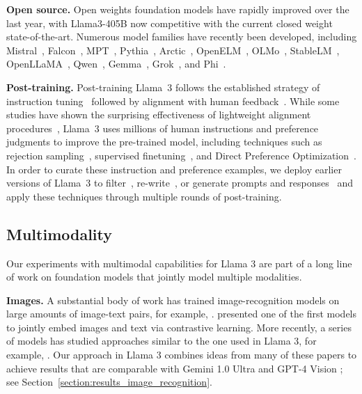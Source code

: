 \textbf{Open source.} Open weights foundation models have rapidly improved over the last year, with Llama3-405B now competitive with the current closed weight state-of-the-art. Numerous model families have recently been developed, including Mistral~\citep{jiang2023mistral}, Falcon~\citep{almazrouei2023falcon}, MPT~\citep{databricksmpt}, Pythia~\citep{biderman2023pythia}, Arctic~\citep{snowflakearctic}, OpenELM~\citep{mehta2024openelm}, OLMo~\citep{groeneveld2024olmoacceleratingsciencelanguage}, StableLM~\citep{bellagente2024stable}, OpenLLaMA~\citep{openlm2023openllama}, Qwen~\citep{bai2023qwen}, Gemma~\citep{team2024gemma}, Grok~\citep{xaigrok}, and Phi~\citep{abdin2024phi}.

\textbf{Post-training.}
Post-training Llama~3 follows the established strategy of instruction tuning~\citep{chung2022scalinginstruction,ouyang2022instructgpt} followed by alignment with human feedback~\citep{kaufmann2023survey}. While some studies have shown the surprising effectiveness of lightweight alignment procedures~\citep{zhou2024lima}, Llama~3 uses millions of human instructions and preference judgments to improve the pre-trained model, including techniques such as rejection sampling~\citep{constitutional-ai-bai}, supervised finetuning~\citep{sanh2022multitask}, and Direct Preference Optimization~\citep{rafailov2023dpo}. In order to curate these instruction and preference examples, we deploy earlier versions of Llama~3 to filter~\citep{liu2024makesgooddataalignment}, re-write~\citep{pan2024selfcorrection}, or generate prompts and responses~\citep{liu2024bestpractices} and apply these techniques through multiple rounds of post-training.

\subsection{Multimodality}
\label{section:related_work_multimodality}
Our experiments with multimodal capabilities for Llama 3 are part of a long line of work on foundation models that jointly model multiple modalities.

\textbf{Images.} 
A substantial body of work has trained image-recognition models on large amounts of image-text pairs, for example, \citet{Mahajan_2018_ECCV,xiao2024florence,chameleon2024,openai2023gpt4blog}.
\citet{radford2021learning} presented one of the first models to jointly embed images and text via contrastive learning. More recently, a series of models has studied approaches similar to the one used in Llama 3, for example, \citet{alayrac2022flamingo,dai2023instructblip,liu2023llava,liu2023improvedllava,yang2023mmreact,ye2023mplug,zhu2023minigpt}.
Our approach in Llama 3 combines ideas from many of these papers to achieve results that are comparable with Gemini 1.0 Ultra \citep{gemini2023gemini} and GPT-4 Vision \citep{openai2023gpt4blog}; see Section~\ref{section:results_image_recognition}.

